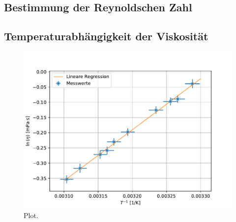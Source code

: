 \subsection{Bestimmung der Reynoldschen Zahl}
\label{sec:}

\subsection{Temperaturabhängigkeit der Viskosität}
\label{sec:}

\begin{figure}
  \centering
  \includegraphics{plot.pdf}
  \caption{Plot.}
  \label{fig:plot}
\end{figure}

